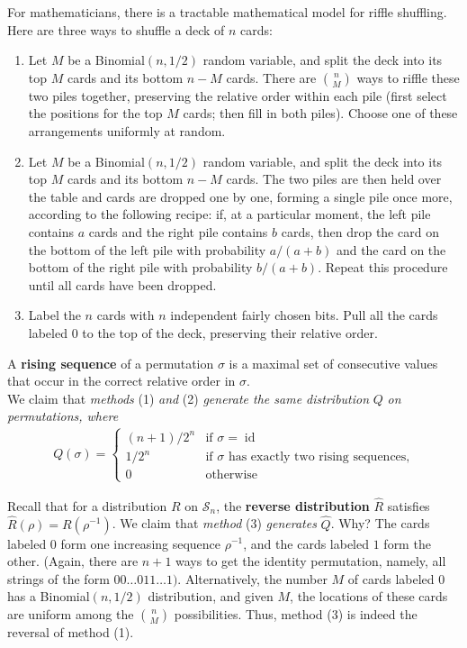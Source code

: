 \documentclass[12pt]{article}
\DeclareMathOperator*{\id}{\text{id}}
\begin{document}
For mathematicians, there is a tractable mathematical model for riffle shuffling. Here are three ways to shuffle a deck of $n$ cards:
\begin{enumerate}
\item Let $M$ be a Binomial$(n, 1/2)$ random variable, and split the deck into its top $M$ cards and its bottom $n - M$ cards. There are $n \choose M$ ways to riffle these two piles together, preserving the relative order within each pile (first select the positions for the top $M$ cards; then fill in both piles). Choose one of these arrangements uniformly at random.
\item Let $M$ be a Binomial$(n, 1/2)$ random variable, and split the deck into its top $M$ cards and its bottom $n-M$ cards. The two piles are then held over the table and cards are dropped one by one, forming a single pile once more, according to the following recipe: if, at a particular moment, the left pile contains $a$ cards and the right pile contains $b$  cards, then drop the card on the bottom of the left pile with probability $a/(a+b)$ and the card on the bottom of the right pile with probability $b/(a+b)$. Repeat this procedure until all cards have been dropped.
\item Label the $n$ cards with $n$ independent fairly chosen bits. Pull all the cards labeled $0$ to the top of the deck, preserving their relative order.
\end{enumerate}

A \textbf{rising sequence} of a permutation $\sigma$ is a maximal set of consecutive values that occur in the correct relative order in $\sigma$.\\

We claim that \textit{methods} (1) \textit{and} (2) \textit{generate the same distribution} $Q$ \textit{on permutations, where}
\begin{align*}
Q(\sigma) = \begin{cases}
(n+1)/2^n & \text{if } \sigma = \id\\
1/2^n & \text{if } \sigma \text{ has exactly two rising sequences,}\\
0 & \text{otherwise}
\end{cases}
\end{align*}

Recall that for a distribution $R$ on $\mathcal{S}_n$, the \textbf{reverse distribution} $\hat{R}$ satisfies $\hat{R}(\rho) = R(\rho^{-1})$. We claim that \textit{method} (3) \textit{generates} $\hat{Q}$. Why? The cards labeled $0$ form one increasing sequence $\rho^{-1}$, and the cards labeled $1$ form the other. (Again, there are $n+1$ ways to get the identity permutation, namely, all strings of the form $00\ldots 011 \ldots 1)$. Alternatively, the number $M$ of cards labeled $0$ has a Binomial$(n, 1/2)$ distribution, and given $M$, the locations of these cards are uniform among the $n \choose M$ possibilities. Thus, method (3) is indeed the reversal of method (1).\\
\end{document}
